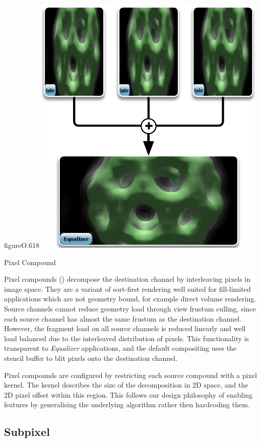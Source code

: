 \begin{wrapfloat}{figure}{O}{.618\textwidth}
 \includegraphics[width=.618\textwidth]{images/Pixel}
 {\caption{\label{fPixel}Pixel Compound}}
\end{wrapfloat}

Pixel compounds () decompose the destination channel by
interleaving pixels in image space. They are a variant of sort-first rendering
well suited for fill-limited applications which are not geometry bound, for
example direct volume rendering. Source channels cannot reduce geometry load
through view frustum culling, since each source channel has almost the same
frustum as the destination channel. However, the fragment load on all source
channels is reduced linearly and well load balanced due to the interleaved
distribution of pixels. This functionality is transparent to {\em Equalizer}
applications, and the default compositing uses the stencil buffer to blit
pixels onto the destination channel.

Pixel compounds are configured by restricting each source compound with a pixel
kernel. The kernel describes the size of the decomposition in 2D space, and the
2D pixel offset within this region. This follows our design philosophy of
enabling features by generalising the underlying algorithm rather then
hardcoding them.

\subsection{Subpixel}


